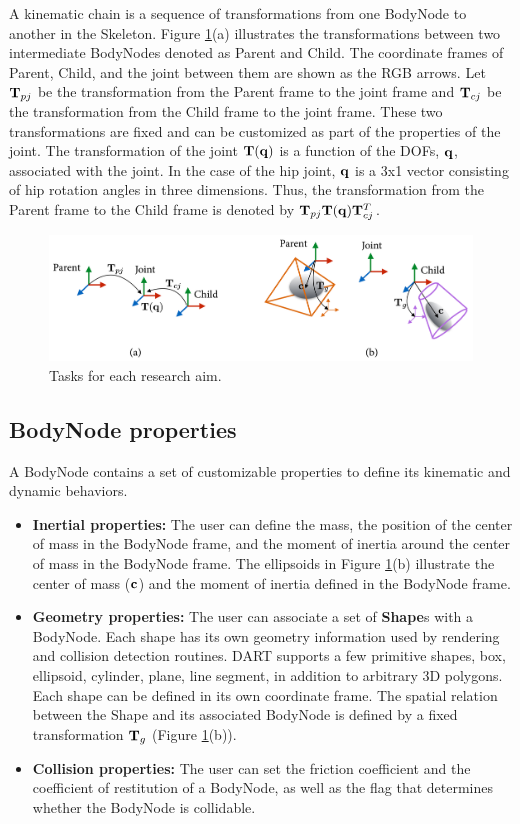 A kinematic chain is a sequence of transformations from one BodyNode to another in the Skeleton. Figure \ref{fig:parentChild}(a) illustrates the transformations between two intermediate BodyNodes denoted as Parent and Child. The coordinate frames of Parent, Child, and the joint between them are shown as the RGB arrows. Let $\mathbf{T}_{pj}$ be the transformation from the Parent frame to the joint frame and $\mathbf{T}_{cj}$ be the transformation from the Child frame to the joint frame. These two transformations are fixed and can be customized as part of the properties of the joint. The transformation of the joint $\mathbf{T}(\mathbf{q})$ is a function of the DOFs, $\mathbf{q}$, associated with the joint. In the case of the hip joint, $\mathbf{q}$ is a 3x1 vector consisting of hip rotation angles in three dimensions. Thus, the transformation from the Parent frame to the Child frame is denoted by $\mathbf{T}_{pj}\mathbf{T}(\mathbf{q})\mathbf{T}_{cj}^T$.

\begin{figure}
\centering
\includegraphics[width=6.0in]{parentChild.jpg}
\caption{Tasks for each research aim.}
\label{fig:parentChild}
\end{figure}


\subsection{BodyNode properties}
A BodyNode contains a set of customizable properties to define its kinematic and dynamic behaviors.
\begin{itemize}[leftmargin=*] \itemsep1pt \parskip0pt 
  \item{\textbf{Inertial properties:}} The user can define the mass, the position of the center of mass in the BodyNode frame, and the moment of inertia around the center of mass in the BodyNode frame. The ellipsoids in Figure \ref{fig:parentChild}(b) illustrate the center of mass ($\mathbf{c}$) and the moment of inertia defined in the BodyNode frame.
  \item{\textbf{Geometry properties:}} The user can associate a set of \textbf{Shape}s with a BodyNode. Each shape has its own geometry information used by rendering and collision detection routines. DART supports a few primitive shapes, box, ellipsoid, cylinder, plane, line segment, in addition to arbitrary 3D polygons. Each shape can be defined in its own coordinate frame. The spatial relation between the Shape and its associated BodyNode is defined by a fixed transformation $\mathbf{T}_g$ (Figure \ref{fig:parentChild}(b)).
  \item{\textbf{Collision properties:}} The user can set the friction coefficient and the coefficient of restitution of a BodyNode, as well as the flag that determines whether the BodyNode is collidable.
\end{itemize}

